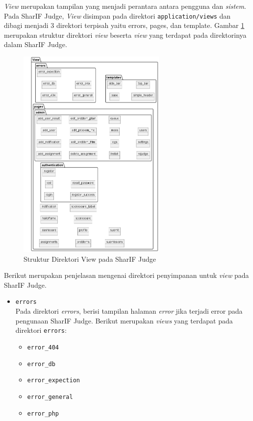 \documentclass[a4paper,twoside]{article}
\begin{document}
\begin{enumerate}
\begin{itemize}
		            \textit{View} merupakan tampilan yang menjadi perantara antara pengguna dan \textit{sistem}. Pada SharIF Judge, \textit{View} disimpan pada direktori \verb|application/views| dan dibagi menjadi 3 direktori terpisah yaitu errors, pages, dan template.
		            Gambar \ref{fig:3:1:1:view} merupakan struktur direktori \textit{view} beserta \textit{view} yang terdapat pada direktorinya dalam SharIF Judge.
		            \begin{figure}[H]
			            \centering
			            \includegraphics[width=0.65\textwidth]{analisis/mvc/view.png}
			            \caption{Struktur Direktori View pada SharIF Judge}
			            \label{fig:3:1:1:view}
		            \end{figure}
		            Berikut merupakan penjelasan mengenai direktori penyimpanan untuk \textit{view} pada SharIF Judge.

		            \begin{itemize}
			            \item \verb|errors| \\
			                  Pada direktori \textit{errors}, berisi tampilan halaman \textit{error} jika terjadi error pada pengunaan SharIF Judge. Berikut merupakan \textit{views} yang terdapat pada direktori \verb|errors|:

			                  \begin{itemize}
				                  \item \verb|error_404|
				                  \item \verb|error_db|
				                  \item \verb|error_expection|
				                  \item \verb|error_general|
				                  \item \verb|error_php|
			                  \end{itemize}


\end{itemize}
\end{itemize}
\end{enumerate}
\end{document}
